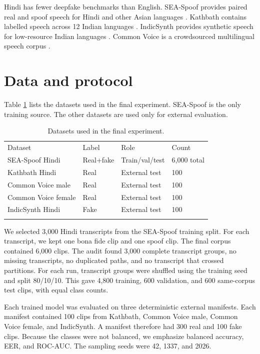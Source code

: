 \documentclass[3p,times,procedia]{elsarticle}
\begin{document}
Hindi has fewer deepfake benchmarks than English. SEA-Spoof provides paired
real and spoof speech for Hindi and other Asian languages
\cite{wu2025seaspoof}. Kathbath contains labelled speech across 12 Indian
languages \cite{javed2022indicsuperb}. IndicSynth provides synthetic speech
for low-resource Indian languages \cite{sharma2025indicsynth}. Common Voice
is a crowdsourced multilingual speech corpus \cite{ardila2020commonvoice}.

\section{Data and protocol}
Table \ref{tab:data} lists the datasets used in the final experiment.
SEA-Spoof is the only training source. The other datasets are used only for
external evaluation.

\begin{table}[h]
\caption{Datasets used in the final experiment.}
\label{tab:data}
\begin{tabular*}{\hsize}{@{\extracolsep{\fill}}llll@{}}
\toprule
Dataset & Label & Role & Count \\
\colrule
SEA-Spoof Hindi & Real+fake & Train/val/test & 6,000 total \\
Kathbath Hindi & Real & External test & 100 \\
Common Voice male & Real & External test & 100 \\
Common Voice female & Real & External test & 100 \\
IndicSynth Hindi & Fake & External test & 100 \\
\botrule
\end{tabular*}
\end{table}

We selected 3,000 Hindi transcripts from the SEA-Spoof training split. For
each transcript, we kept one bona fide clip and one spoof clip. The final
corpus contained 6,000 clips. The audit found 3,000 complete transcript
groups, no missing transcripts, no duplicated paths, and no transcript that
crossed partitions. For each run, transcript groups were shuffled using the
training seed and split 80/10/10. This gave 4,800 training, 600 validation,
and 600 same-corpus test clips, with equal class counts.

Each trained model was evaluated on three deterministic external manifests.
Each manifest contained 100 clips from Kathbath, Common Voice male, Common
Voice female, and IndicSynth. A manifest therefore had 300 real and 100 fake
clips. Because the classes were not balanced, we emphasize balanced
accuracy, EER, and ROC-AUC. The sampling seeds were 42, 1337, and 2026.
\end{document}
